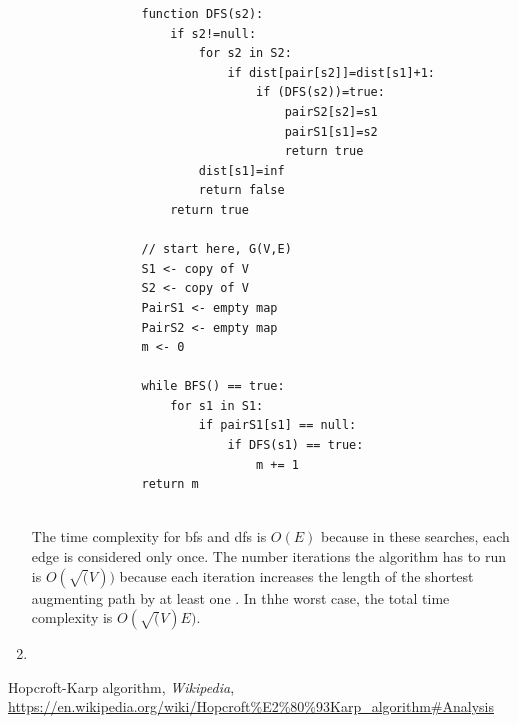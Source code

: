\documentclass{article}
\begin{document}
\begin{enumerate}
\begin{enumerate}
\begin{lstlisting}
            function DFS(s2):
                if s2!=null:
                    for s2 in S2:
                        if dist[pair[s2]]=dist[s1]+1:
                            if (DFS(s2))=true:
                                pairS2[s2]=s1
                                pairS1[s1]=s2
                                return true
                    dist[s1]=inf
                    return false
                return true
    
            // start here, G(V,E)
            S1 <- copy of V
            S2 <- copy of V
            PairS1 <- empty map
            PairS2 <- empty map
            m <- 0
    
            while BFS() == true:
                for s1 in S1:
                    if pairS1[s1] == null:
                        if DFS(s1) == true:
                            m += 1
            return m
    
        \end{lstlisting}
    \end{enumerate}

    The time complexity for bfs and dfs is $O(E)$ because in these searches, each edge is considered only once.
    The number iterations the algorithm has to run is $O(\sqrt(V))$ because each iteration increases the length of the shortest augmenting path by at least one \cite{wiki}.
    In thhe worst case, the total time complexity is $O(\sqrt(V)E)$.

    \item 
\end{enumerate}

\begin{thebibliography}{9}
    
    Hopcroft-Karp algorithm, \emph{Wikipedia}, \url{https://en.wikipedia.org/wiki/Hopcroft%E2%80%93Karp_algorithm#Analysis}
    
    \end{thebibliography}
\end{document}
